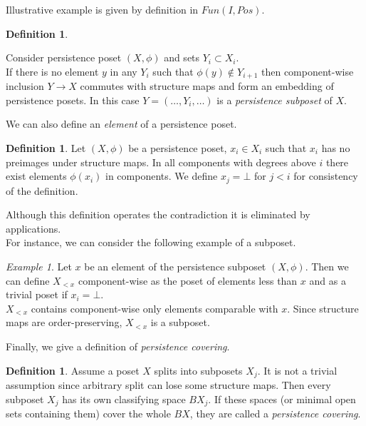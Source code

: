\documentclass[english,12pt]{article}
\newcounter{stmcounter}[section]
\numberwithin{equation}{section}
\theoremstyle{definition}
\newtheorem{definition}[stmcounter]{Definition}
\theoremstyle{remark}
\newtheorem{example}[stmcounter]{Example}
\newcommand{\define}[1]{{\textit{#1}}}
\begin{document}
Illustrative example is given by definition in $Fun(I, Pos)$.\\

\begin{definition} ~ \par
  Consider persistence poset $(X,\phi)$ and sets $Y_i \subset X_i$.\\

  If there is no element $y$ in any $Y_i$ such that $\phi(y) \not\in Y_{i+1}$ then component-wise inclusion $Y \to X$ commutes with structure maps and form an embedding of persistence posets. In this case $Y=(\ldots,Y_i,\ldots)$ is a \define {persistence subposet} of $X$.
\end{definition}

We can also define an \define{element} of a persistence poset.
\begin{definition}
  Let $(X,\phi)$ be a persistence poset, $x_i \in X_i$ such that $x_i$ has no preimages under structure maps. In all components with degrees above $i$ there exist elements $\phi(x_i)$ in components. We define $x_j = \bot$ for $j < i$ for consistency of the definition.
\end{definition}

Although this definition operates the contradiction it is eliminated by applications.\\
For instance, we can consider the following example of a subposet.
\begin{example}
  Let $x$ be an element of the persistence subposet $(X, \phi)$. Then we can define $X_{<x}$ component-wise as the poset of elements less than $x$ and as a trivial poset if $x_i = \bot$.\\

  $X_{<x}$ contains component-wise only elements comparable with $x$. Since structure maps are order-preserving, $X_{<x}$ is a subposet.
\end{example}

Finally, we give a definition of \define{persistence covering}.\\

\begin{definition}
  Assume a poset $X$ splits into subposets $X_j$. It is not a trivial assumption since arbitrary split can lose some structure maps. Then every subposet $X_j$ has its own classifying space $BX_j$. If these spaces (or minimal open sets containing them) cover the whole $BX$, they are called a \define{persistence covering}.
\end{definition}
\end{document}
